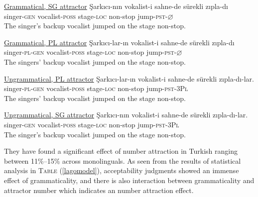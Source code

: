 \documentclass[11pt,a4paper]{article}
\begin{document}
\begin{exe}
\ex
\begin{xlist}
\ex \underline{Grammatical, SG attractor} \label{lago1}
\gll \c{S}ark{\i}c{\i}-n{\i}n vokalist-i sahne-de s\"{u}rekli z{\i}pla-d{\i}\\
singer-\textsc{gen} vocalist-\textsc{poss} stage-\textsc{loc} non-stop jump-\textsc{pst}-$\varnothing$\\
\glt The singer's backup vocalist jumped on the stage non-stop.

\ex \underline{Grammatical, PL attractor} \label{lago2}
\gll \c{S}ark{\i}c{\i}-lar-{\i}n vokalist-i sahne-de s\"{u}rekli z{\i}pla-d{\i}\\
singer-\textsc{pl}-\textsc{gen} vocalist-\textsc{poss} stage-\textsc{loc} non-stop jump-\textsc{pst}-$\varnothing$\\
\glt The singers' backup vocalist jumped on the stage non-stop.

\ex \underline{Ungrammatical, PL attractor} \label{lago3}
\gll \c{S}ark{\i}c{\i}-lar-{\i}n vokalist-i sahne-de s\"{u}rekli z{\i}pla-d{\i}-lar.\\
singer-\textsc{pl}-\textsc{gen} vocalist-\textsc{poss} stage-\textsc{loc} non-stop jump-\textsc{pst}-\textsc{3Pl}\\
\glt The singers' backup vocalist jumped on the stage non-stop.

\ex \underline{Ungrammatical, SG attractor} \label{lago4}
\gll \c{S}ark{\i}c{\i}-n{\i}n vokalist-i sahne-de s\"{u}rekli z{\i}pla-d{\i}-lar.\\
singer-\textsc{gen} vocalist-\textsc{poss} stage-\textsc{loc} non-stop jump-\textsc{pst}-\textsc{3Pl}\\
\glt The singer's backup vocalist jumped on the stage non-stop.
\end{xlist}
\end{exe}

They have found a significant effect of number attraction in Turkish
ranging between 11\%--15\% across monolinguals. As seen from the results
of statistical analysis in \textsc{Table} (\ref{lagomodel}),
acceptability judgments showed an immense effect of grammaticality, and
there is also interaction between grammaticality and attractor number
which indicates an number attraction effect.
\end{document}
